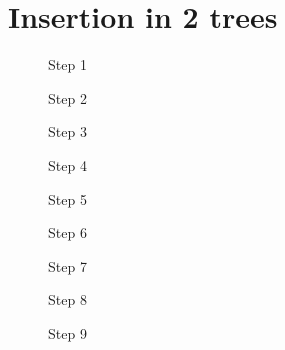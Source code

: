 \documentclass{article}
\begin{document}
\section{Insertion in 2 trees}
\captionsetup[figure]{labelformat=empty}
	\begin{figure}[H]
		\centering
		\begin{minipage}{.33\textwidth}
			\centering
			
			\caption{Step 1}
		\end{minipage}\hfill
		\begin{minipage}{.33\textwidth}
			\centering
			
			\caption{Step 2}
		\end{minipage}\hfill
		\begin{minipage}{.25\textwidth}
			\centering
			
			\caption{Step 3}
		\end{minipage}\hfill
	\end{figure}
	\begin{figure}[H]
		\centering
		\begin{minipage}{.33\textwidth}
			\centering
			
			\caption{Step 4}
		\end{minipage}\hfill
		\begin{minipage}{.33\textwidth}
			\centering
			
			\caption{Step 5}
		\end{minipage}\hfill
		\begin{minipage}{.33\textwidth}
			\centering
			
			\caption{Step 6}
		\end{minipage}\hfill
	\end{figure}
	\begin{figure}[H]
		\centering
		\begin{minipage}{.33\textwidth}
			\centering
			
			\caption{Step 7}
		\end{minipage}\hfill
		\begin{minipage}{.33\textwidth}
			\centering
			
			\caption{Step 8}
		\end{minipage}\hfill
		\begin{minipage}{.33\textwidth}
			\centering
			
			\caption{Step 9}
		\end{minipage}\hfill
	\end{figure}
\end{document}
